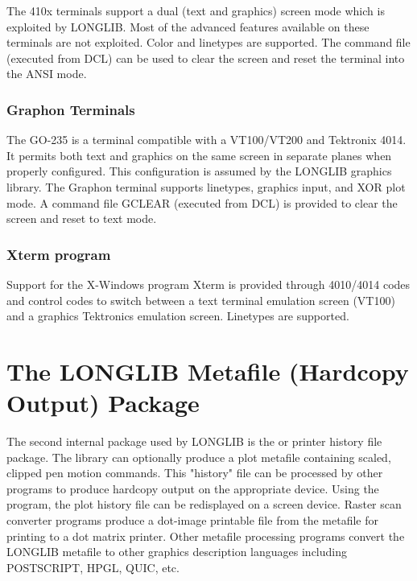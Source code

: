 \documentclass[11pt]{report}
\begin{document}
The  410x terminals support a dual (text and graphics)
screen mode which is exploited by LONGLIB.  Most of the advanced
features available on these terminals are not exploited.  Color and
linetypes are supported.  The command file  (executed from
DCL) can be used to clear the screen and reset the terminal into the
ANSI mode.

\subsubsection{Graphon Terminals}

The  GO-235 is a terminal compatible with a VT100/VT200 and
Tektronix 4014.  It permits both text and graphics on the same screen
in separate planes when properly configured.  This configuration is
assumed by the LONGLIB graphics library.  The Graphon terminal supports
linetypes, graphics input, and XOR plot mode.
A command file GCLEAR (executed
from DCL) is provided to clear the screen and reset to text mode.

\subsubsection{Xterm program}
Support for the X-Windows program Xterm is provided through 
4010/4014 codes and control codes to switch between a text terminal
emulation screen (VT100) and a graphics Tektronics emulation screen.
Linetypes are supported.


\section{The LONGLIB Metafile (Hardcopy Output) Package}

The second internal package used by LONGLIB is the  or
printer history file package.  The library can optionally produce a
plot metafile containing scaled, clipped pen motion commands.  This
"history" file can be processed by other programs to produce hardcopy
output on the appropriate device.  Using the  program, the
plot history file can be redisplayed on a screen device.  Raster scan
converter programs produce a dot-image printable file from the
metafile for printing to a dot matrix printer.  Other metafile
processing programs convert the LONGLIB metafile to other graphics
description languages including POSTSCRIPT, HPGL, QUIC, etc.
\end{document}
